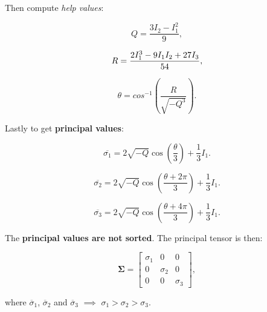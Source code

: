 \begin{itemize}
        Then compute \textit{help values}:

        \begin{equation}
            Q = \frac{3 I_{2} - I_{1}^{2}}{9}
        ,\end{equation}

        \begin{equation}
            R = \frac{2 I_{1}^{3} - 9 I_{1} I_{2} + 27 I_{3}}{54} \\
        ,\end{equation}

        \begin{equation}
            \theta = cos^{-1} \left( \frac{ R }{ \sqrt{- Q^{3}}} \right)
        .\end{equation}

        Lastly to get \textbf{principal values}:

        \begin{equation}
            \overline{\sigma_{1}}
            = 2 \sqrt{-Q} \cos{\left(\frac{\theta}{3}\right)} + \frac{1}{3}I_{1}
        .\end{equation}

        \begin{equation}
            \overline{\sigma_{2}}
            = 2 \sqrt{-Q} \cos{\left(\frac{\theta + 2 \pi}{3}\right)} + \frac{1}{3}I_{1}
        .\end{equation}

        \begin{equation}
            \overline{\sigma_{3}}
            = 2 \sqrt{-Q} \cos{\left(\frac{\theta + 4 \pi}{3}\right)} + \frac{1}{3}I_{1}
        .\end{equation}

        The \textbf{principal values are not sorted}. The principal tensor is then:

        \begin{equation}
            \mathbf{\Sigma} = \begin{bmatrix}
                \sigma_{1} & 0 & 0 \\
                0 & \sigma_{2}  & 0 \\
                0 & 0 & \sigma_{3}
            \end{bmatrix}
        ,\end{equation}

        where $\overline{\sigma}_{1}$, $\overline{\sigma}_{2}$ and $\overline{\sigma}_{3}$
        $\implies$ $\sigma_1 > \sigma_2 > \sigma_3$.


\end{itemize}

